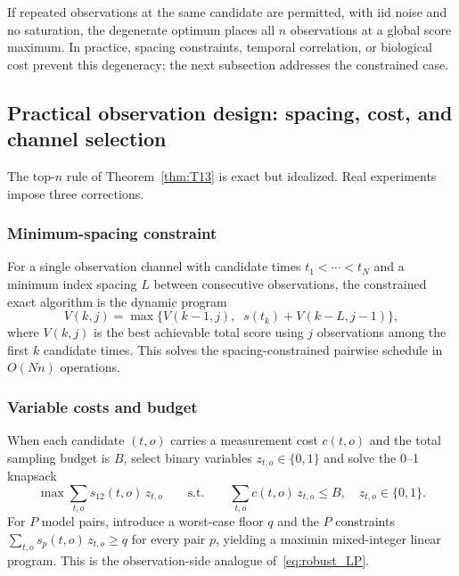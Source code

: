 \begin{remark}
If repeated observations at the same candidate are permitted, with iid noise and no saturation, the degenerate optimum places all \(n\) observations at a global score maximum. In practice, spacing constraints, temporal correlation, or biological cost prevent this degeneracy; the next subsection addresses the constrained case.
\end{remark}

\subsection{Practical observation design: spacing, cost, and channel selection}
\label{sec:practical_obs}

The top-\(n\) rule of Theorem~\ref{thm:T13} is exact but idealized. Real experiments impose three corrections.

\subsubsection*{Minimum-spacing constraint}

For a single observation channel with candidate times \(t_1 < \cdots < t_N\) and a minimum index spacing \(L\) between consecutive observations, the constrained exact algorithm is the dynamic program
\begin{equation}
V(k, j) = \max\bigl\{ V(k-1, j),\;\; s(t_k) + V(k - L, j - 1) \bigr\},
\label{eq:dp_spacing}
\end{equation}
where \(V(k, j)\) is the best achievable total score using \(j\) observations among the first \(k\) candidate times. This solves the spacing-constrained pairwise schedule in \(O(N n)\) operations.

\subsubsection*{Variable costs and budget}

When each candidate \((t, o)\) carries a measurement cost \(c(t, o)\) and the total sampling budget is \(B\), select binary variables \(z_{t,o} \in \{0, 1\}\) and solve the 0--1 knapsack
\begin{equation}
\max \sum_{t, o} s_{12}(t, o)\, z_{t, o}
\qquad\text{s.t.}\qquad
\sum_{t, o} c(t, o)\, z_{t, o} \le B,\quad z_{t, o} \in \{0, 1\}.
\label{eq:knapsack}
\end{equation}
For \(P\) model pairs, introduce a worst-case floor \(q\) and the \(P\) constraints \(\sum_{t, o} s_p(t, o)\, z_{t, o} \ge q\) for every pair \(p\), yielding a maximin mixed-integer linear program. This is the observation-side analogue of~\eqref{eq:robust_LP}.

